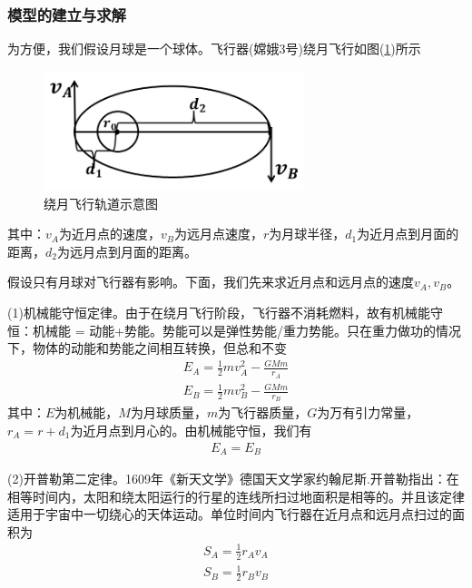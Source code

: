         \subsubsection{模型的建立与求解}
            \par
            为方便，我们假设月球是一个球体。飞行器(嫦娥3号)绕月飞行如图(\ref{fig:绕月飞行轨道示意图})所示
            \begin{figure}[H]
            \centering
            \includegraphics[height=3.5cm]{images/Lunar_orbit.jpg}
            \caption{绕月飞行轨道示意图}
            \label{fig:绕月飞行轨道示意图}
            \end{figure}
            \noindent 其中：$v_A$为近月点的速度，$v_B$为远月点速度，$r$为月球半径，$d_1$为近月点到月面的距离，$d_2$为远月点到月面的距离。
            \par
            假设只有月球对飞行器有影响。下面，我们先来求近月点和远月点的速度$v_A,v_B$。
            \par
            (1)机械能守恒定律。由于在绕月飞行阶段，飞行器不消耗燃料，故有机械能守恒：机械能 = 动能+势能。势能可以是弹性势能/重力势能。只在重力做功的情况下，物体的动能和势能之间相互转换，但总和不变
            \begin{align*}
            E_A = \frac{1}{2}mv_A^2 - \frac{GMm}{r_A}\\
            E_B = \frac{1}{2}mv_B^2 - \frac{GMm}{r_B}
            \end{align*}
            其中：$E$为机械能，$M$为月球质量，$m$为飞行器质量，$G$为万有引力常量，$r_A = r+d_1$为近月点到月心的。由机械能守恒，我们有
            \begin{align}
            \label{机械能守恒}
            E_A = E_B
            \end{align}
            \par
            (2)开普勒第二定律。1609年《新天文学》德国天文学家约翰尼斯.开普勒指出：在相等时间内，太阳和绕太阳运行的行星的连线所扫过地面积是相等的。并且该定律适用于宇宙中一切绕心的天体运动。单位时间内飞行器在近月点和远月点扫过的面积为
            \begin{align*}
            S_A = \frac{1}{2}r_A v_A\\
            S_B = \frac{1}{2}r_B v_B
            \end{align*}
